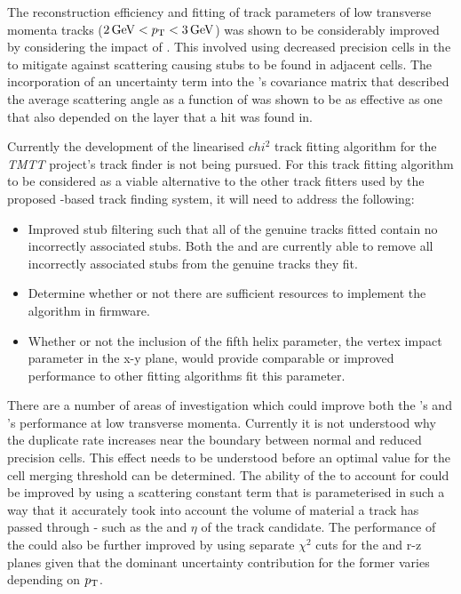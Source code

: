 The reconstruction efficiency and fitting of track parameters of low transverse momenta tracks ($2\,\text{Ge\hspace{-.08em}V} < p_{\mathrm{T}} < 3\,\text{Ge\hspace{-.08em}V}$) was shown to be considerably improved by considering the impact of \MS.
This involved using decreased precision cells in the \HT to mitigate against scattering causing stubs to be found in adjacent \HT cells.
The incorporation of an uncertainty term into the \KF's covariance matrix that described the average scattering angle as a function of \pT was shown to be as effective as one that also depended on the layer that a hit was found in.

Currently the development of the linearised $chi^{2}$ track fitting algorithm for the \emph{TMTT} project's track finder is not being pursued.
For this track fitting algorithm to be considered as a viable alternative to the other track fitters used by the proposed \HT-based track finding system, it will need to address the following:

\begin{itemize}
\item Improved stub filtering such that all of the genuine tracks fitted contain no incorrectly associated stubs. Both the \KF and \LR are currently able to remove all incorrectly associated stubs from the genuine tracks they fit. 
\item Determine whether or not there are sufficient resources to implement the algorithm in firmware.
\item Whether or not the inclusion of the fifth helix parameter, the vertex impact parameter in the x-y plane, would provide comparable or improved performance to other fitting algorithms fit this parameter.
\end{itemize}

There are a number of areas of investigation which could improve both the \HT's and \KF's performance at low  transverse momenta.
Currently it is not understood why the duplicate rate increases near the boundary between normal and reduced precision \HT cells.
This effect needs to be understood before an optimal value for the cell merging threshold can be determined.
The ability of the \KF to account for \MS could be improved by using a scattering constant term that is parameterised in such a way that it accurately took into account the volume of material a track has passed through - such as the \pt and $\eta$ of the track candidate.
The performance of the \KF could also be further improved by using separate \KF $\chi^{2}$ cuts for the \rphi and r-z planes given that the dominant uncertainty contribution for the former varies depending on $p_{\mathrm{T}}$.